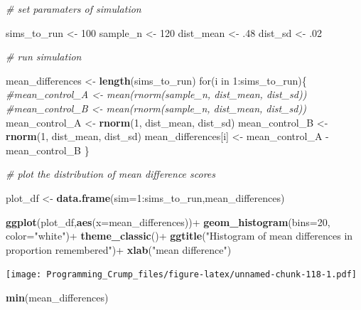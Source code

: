 \documentclass[]{book}
\newenvironment{Shaded}{\begin{snugshade}}{\end{snugshade}}
\newcommand{\KeywordTok}[1]{\textcolor[rgb]{0.13,0.29,0.53}{\textbf{{#1}}}}
\newcommand{\DataTypeTok}[1]{\textcolor[rgb]{0.13,0.29,0.53}{{#1}}}
\newcommand{\DecValTok}[1]{\textcolor[rgb]{0.00,0.00,0.81}{{#1}}}
\newcommand{\StringTok}[1]{\textcolor[rgb]{0.31,0.60,0.02}{{#1}}}
\newcommand{\CommentTok}[1]{\textcolor[rgb]{0.56,0.35,0.01}{\textit{{#1}}}}
\newcommand{\NormalTok}[1]{{#1}}
\theoremstyle{definition}
\theoremstyle{definition}
\theoremstyle{definition}
\theoremstyle{remark}
\begin{document}
\begin{Shaded}
\begin{Highlighting}[]
\CommentTok{# set paramaters of simulation}

\NormalTok{sims_to_run <-}\StringTok{ }\DecValTok{100}
\NormalTok{sample_n   <-}\StringTok{ }\DecValTok{120}
\NormalTok{dist_mean  <-}\StringTok{ }\NormalTok{.}\DecValTok{48}
\NormalTok{dist_sd    <-}\StringTok{ }\NormalTok{.}\DecValTok{02}

\CommentTok{# run simulation}

\NormalTok{mean_differences <-}\StringTok{ }\KeywordTok{length}\NormalTok{(sims_to_run)}
\NormalTok{for(i in }\DecValTok{1}\NormalTok{:sims_to_run)\{}
  \CommentTok{#mean_control_A      <- mean(rnorm(sample_n, dist_mean, dist_sd))}
  \CommentTok{#mean_control_B      <- mean(rnorm(sample_n, dist_mean, dist_sd))}
  \NormalTok{mean_control_A      <-}\StringTok{ }\KeywordTok{rnorm}\NormalTok{(}\DecValTok{1}\NormalTok{, dist_mean, dist_sd)}
  \NormalTok{mean_control_B      <-}\StringTok{ }\KeywordTok{rnorm}\NormalTok{(}\DecValTok{1}\NormalTok{, dist_mean, dist_sd)}
  \NormalTok{mean_differences[i] <-}\StringTok{ }\NormalTok{mean_control_A -}\StringTok{ }\NormalTok{mean_control_B}
\NormalTok{\}}

\CommentTok{# plot the  distribution of mean difference scores}

\NormalTok{plot_df <-}\StringTok{ }\KeywordTok{data.frame}\NormalTok{(}\DataTypeTok{sim=}\DecValTok{1}\NormalTok{:sims_to_run,mean_differences)}

\KeywordTok{ggplot}\NormalTok{(plot_df,}\KeywordTok{aes}\NormalTok{(}\DataTypeTok{x=}\NormalTok{mean_differences))+}
\StringTok{  }\KeywordTok{geom_histogram}\NormalTok{(}\DataTypeTok{bins=}\DecValTok{20}\NormalTok{, }\DataTypeTok{color=}\StringTok{"white"}\NormalTok{)+}
\StringTok{  }\KeywordTok{theme_classic}\NormalTok{()+}
\StringTok{  }\KeywordTok{ggtitle}\NormalTok{(}\StringTok{"Histogram of mean differences in proportion remembered"}\NormalTok{)+}
\StringTok{  }\KeywordTok{xlab}\NormalTok{(}\StringTok{"mean difference"}\NormalTok{)}
\end{Highlighting}
\end{Shaded}

\texttt{[image: Programming\_Crump\_files/figure-latex/unnamed-chunk-118-1.pdf]}

\begin{Shaded}
\begin{Highlighting}[]
\KeywordTok{min}\NormalTok{(mean_differences)}
\end{Highlighting}
\end{Shaded}
\end{document}
